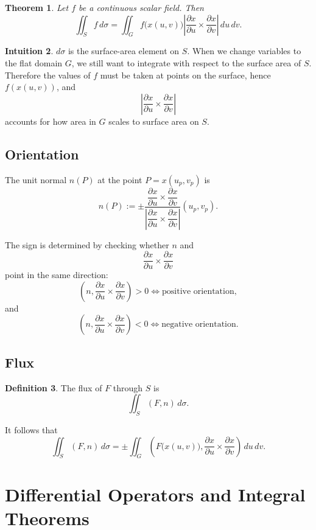 \documentclass[11pt]{report}
\theoremstyle{definition}
\newtheorem{definition}{Definition}[chapter]
\newtheorem{intuition}[definition]{Intuition}
\theoremstyle{plain}
\newtheorem{theorem}[definition]{Theorem}
\theoremstyle{remark}
\newcommand{\ip}[2]{\left(#1,#2\right)}
\begin{document}
\begin{theorem}
Let $f$ be a continuous scalar field. Then
\[
\iint_S f\,d\sigma = \iint_G f\bigl(x(u,v)\bigr)\left|\frac{\partial x}{\partial u}\times \frac{\partial x}{\partial v}\right|\,du\,dv.
\]
\end{theorem}

\begin{intuition}
$d\sigma$ is the surface-area element on $S$. When we change variables to the flat domain $G$, we still want to integrate with respect to the surface area of $S$. Therefore the values of $f$ must be taken at points on the surface, hence $f(x(u,v))$, and
\[
\left|\frac{\partial x}{\partial u}\times \frac{\partial x}{\partial v}\right|
\]
accounts for how area in $G$ scales to surface area on $S$.
\end{intuition}

\section{Orientation}

The unit normal $n(P)$ at the point $P=x(u_p,v_p)$ is
\[
n(P):=\pm \frac{\dfrac{\partial x}{\partial u}\times \dfrac{\partial x}{\partial v}}{\left|\dfrac{\partial x}{\partial u}\times \dfrac{\partial x}{\partial v}\right|}(u_p,v_p).
\]

The sign is determined by checking whether $n$ and
\[
\frac{\partial x}{\partial u}\times \frac{\partial x}{\partial v}
\]
point in the same direction:
\[
\ip{n}{\dfrac{\partial x}{\partial u}\times \dfrac{\partial x}{\partial v}}>0
\iff \text{positive orientation},
\]
and
\[
\ip{n}{\dfrac{\partial x}{\partial u}\times \dfrac{\partial x}{\partial v}}<0
\iff \text{negative orientation}.
\]

\section{Flux}

\begin{definition}
The flux of $F$ through $S$ is
\[
\iint_S \ip{F}{n}\,d\sigma.
\]
\end{definition}

It follows that
\[
\iint_S \ip{F}{n}\,d\sigma
=\pm \iint_G \left(F\bigl(x(u,v)\bigr),\frac{\partial x}{\partial u}\times \frac{\partial x}{\partial v}\right)\,du\,dv.
\]

\chapter{Differential Operators and Integral Theorems}
\end{document}

